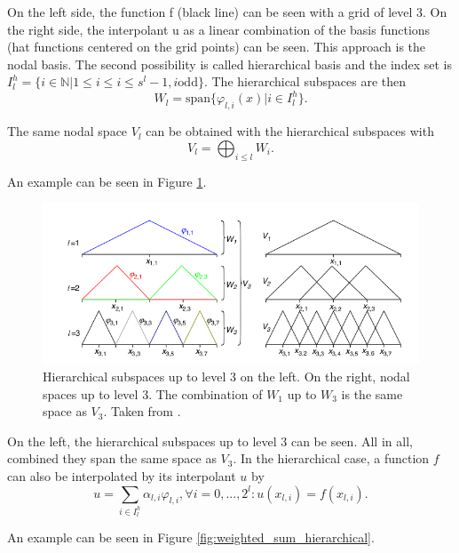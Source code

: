 On the left side, the function f (black line) can be seen with a grid of level 3. On the right side, the interpolant u as a linear combination of the basis functions (hat functions centered on the grid points) can be seen. This approach is the nodal basis. The second possibility is called hierarchical basis and the index set is $I_l^h = \{i \in \mathbb{N} | 1 \le i \le i \le s^l-1, i \text{odd}\}$. The hierarchical subspaces are then 
\begin{equation}
	W_l = \text{span}\{ \varphi_{l,i}(x) | i \in I_l^h\}.
\end{equation}

The same nodal space $ V_l $ can be obtained with the hierarchical subspaces with 
\begin{equation}
	V_l = \bigoplus_{i \le l} W_i.
\end{equation}

An example can be seen in Figure \ref{fig:hierarchical_basis}.
\begin{figure}[htbp!]
	\centering
	\includegraphics[scale=0.5]{figures/hierarchical_basis.png}
	\caption{ Hierarchical subspaces up to level 3 on the left. On the right, nodal spaces up to level 3. The combination of $ W_1 $ up to $ W_3 $ is the same space as $ V_3 $. Taken from \cite{pfluger2010spatially}. }
	\label{fig:hierarchical_basis}
\end{figure}

On the left, the hierarchical subspaces up to level 3 can be seen. All in all, combined they span the same space as $ V_3 $. In the hierarchical case, a function $ f $ can also be interpolated by its interpolant $ u $ by 
\begin{equation}
	u = \sum_{i \in I_l^h}\alpha_{l,i} \varphi_{l,i}, \forall i = 0,...,2^l: u(x_{l,i}) = f(x_{l,i}).
\end{equation}

An example can be seen in Figure \ref{fig:weighted_sum_hierarchical}.


